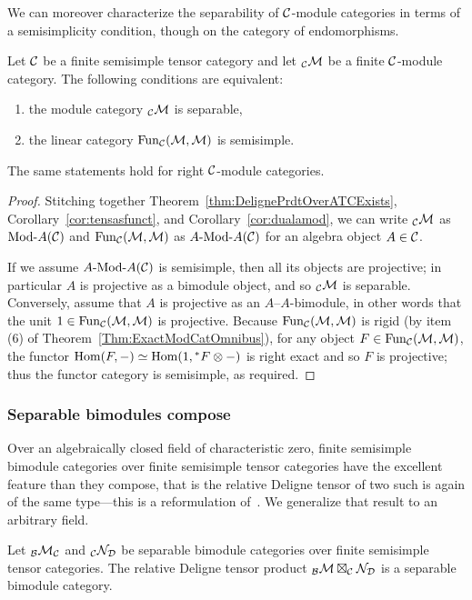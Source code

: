 \documentclass{amsart}
\begin{document}
We can moreover characterize the separability of $\mathcal C$-module categories in terms of a semisimplicity condition, though on the category of endomorphisms.
\begin{theorem} \label{thm:SepModCats}
Let $\mathcal C$ be a finite semisimple tensor category and let ${}_\mathcal C \mathcal M$ be a finite $\mathcal C$-module category.  The following conditions are equivalent:
\begin{enumerate}
\item the module category ${}_\mathcal C \mathcal M$ is separable,
\item the linear category $\operatorname{Fun}_{\mathcal C}(\mathcal M,\mathcal M)$ is semisimple.  
\end{enumerate}
The same statements hold for right $\mathcal C$-module categories.
\end{theorem}
\begin{proof}
Stitching together Theorem~\ref{thm:DelignePrdtOverATCExists}, Corollary~\ref{cor:tensasfunct}, and Corollary~\ref{cor:dualamod}, we can write ${}_\mathcal C \mathcal M$ as $\Mod{}{A}(\cC)$ and $\operatorname{Fun}_{\mathcal C}(\mathcal M,\mathcal M)$ as $\Mod{A}{A}(\cC)$ for an algebra object $A \in \mathcal C$.  

If we assume $\Mod{A}{A}(\cC)$ is semisimple, then all its objects are projective; in particular $A$ is projective as a bimodule object, and so ${}_\mathcal C \mathcal M$ is separable.  Conversely, assume that $A$ is projective as an $A$--$A$-bimodule, in other words that the unit $1 \in \operatorname{Fun}_{\mathcal C}(\mathcal M,\mathcal M)$ is projective.  Because $\operatorname{Fun}_{\mathcal C}(\mathcal M,\mathcal M)$ is rigid (by item (6) of Theorem~\ref{Thm:ExactModCatOmnibus}), for any object $F \in \operatorname{Fun}_{\mathcal C}(\mathcal M,\mathcal M)$, the functor $\operatorname{Hom}(F,-) \simeq \operatorname{Hom}(1,{}^* F \otimes -)$ is right exact and so $F$ is projective; thus the functor category is semisimple, as required.
\end{proof}



\subsubsection{Separable bimodules compose}

Over an algebraically closed field of characteristic zero, finite semisimple bimodule categories over finite semisimple tensor categories have the excellent feature than they compose, that is the relative Deligne tensor of two such is again of the same type---this is a reformulation of~\cite[Theorem 2.16]{MR2183279}.  We generalize that result to an arbitrary field.
\begin{theorem} \label{thm:compositeOfSep}
Let ${}_\mathcal B \mathcal M_\mathcal C$ and ${}_\mathcal C \mathcal N_\mathcal D$ be separable bimodule categories over finite semisimple tensor categories.  The relative Deligne tensor product ${}_{\mathcal B} \mathcal M \boxtimes_\mathcal C \mathcal N_\mathcal D$ is a separable bimodule category.
\end{theorem}
\end{document}
